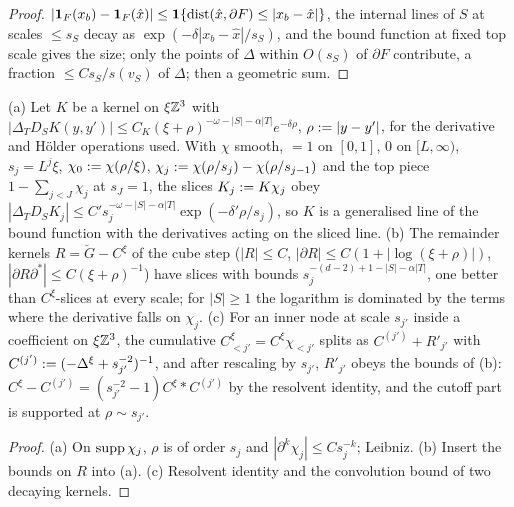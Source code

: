 \begin{proof}
$|\mathbf 1_F(x_b)-\mathbf 1_F(\hat x)|\le\mathbf 1\{\operatorname{dist}(\hat x,\partial F)\le|x_b-\hat x|\}$, the internal lines of $S$ at scales $\le s_S$ decay as $\exp(-\delta|x_b-\hat x|/s_S)$, and the bound function at fixed top scale gives the size; only the points of $\Delta$ within $O(s_S)$ of $\partial F$ contribute, a fraction $\le Cs_S/s(v_S)$ of $\Delta$; then a geometric sum.
\end{proof}

\begin{lemma}\label{lem:a06d:S47}
\textup{(a)} Let $K$ be a kernel on $\xi\mathbb Z^3$ with $|\Delta_TD_SK(y,y')|\le C_K(\xi+\rho)^{-\omega-|S|-\alpha|T|}e^{-\delta\rho}$, $\rho:=|y-y'|$, for the derivative and H\"older operations used. With $\chi$ smooth, $=1$ on $[0,1]$, $0$ on $[L,\infty)$, $s_j=L^j\xi$, $\chi_0:=\chi(\rho/\xi)$, $\chi_j:=\chi(\rho/s_j)-\chi(\rho/s_{j-1})$ and the top piece $1-\sum_{j<J}\chi_j$ at $s_J=1$, the slices $K_j:= K\chi_j$ obey $|\Delta_TD_SK_j|\le C's_j^{-\omega-|S|-\alpha|T|}\exp(-\delta'\rho/s_j)$, so $K$ is a generalised line of the bound function with the derivatives acting on the sliced line. \textup{(b)} The remainder kernels $R=\breve G-C^\xi$ of the cube step ($|R|\le C$, $|\partial R|\le C(1+|\log(\xi+\rho)|)$, $|\partial R\partial^*|\le C(\xi+\rho)^{-1}$) have slices with bounds $s_j^{-(d-2)+1-|S|-\alpha|T|}$, one better than $C^\xi$-slices at every scale; for $|S|\ge1$ the logarithm is dominated by the terms where the derivative falls on $\chi_j$. \textup{(c)} For an inner node at scale $s_{j'}$ inside a coefficient on $\xi\mathbb Z^3$, the cumulative $C^\xi_{<j'}=C^\xi\chi_{<j'}$ splits as $C^{(j')}+R'_{j'}$ with $C^{(j')}:=(-\Delta^\xi+s_{j'}^{-2})^{-1}$, and after rescaling by $s_{j'}$, $R'_{j'}$ obeys the bounds of (b): $C^\xi-C^{(j')}=(s_{j'}^{-2}-1)C^\xi*C^{(j')}$ by the resolvent identity, and the cutoff part is supported at $\rho\sim s_{j'}$.
\end{lemma}

\begin{proof}
(a) On $\operatorname{supp}\chi_j$, $\rho$ is of order $s_j$ and $|\partial^k\chi_j|\le Cs_j^{-k}$; Leibniz. (b) Insert the bounds on $R$ into (a). (c) Resolvent identity and the convolution bound of two decaying kernels.
\end{proof}
